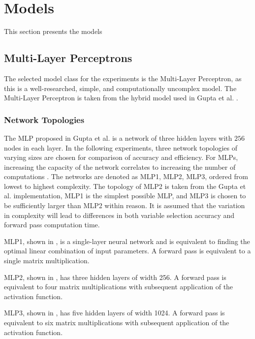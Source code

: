\section{Models}

This section presents the models 


\subsection{Multi-Layer Perceptrons}

The selected model class for the experiments is the Multi-Layer Perceptron, as this is a well-researched, simple, and computationally uncomplex model. The Multi-Layer Perceptron is taken from the hybrid model used in Gupta et al. \cite{gupta2020hybrid}.   


\subsubsection{Network Topologies}

The \gls{MLP} proposed in Gupta et al. \cite{gupta2020hybrid} is a network of three hidden layers with $ 256 $ nodes in each layer. In the following experiments, 
three network topologies of varying sizes are chosen for comparison of accuracy and efficiency. 
For MLPs, increasing the capacity of the network correlates to increasing the number of computations \cite{goodfellow2016deep}. The networks are denoted as MLP1, MLP2, MLP3, ordered from lowest to highest complexity. The topology of MLP2 is taken from the Gupta et al. \cite{gupta2020hybrid} implementation, MLP1 is the simplest possible MLP, and MLP3 is chosen to be sufficiently larger than MLP2 within reason. It is assumed that the variation in complexity will lead to differences in both variable selection accuracy and forward pass computation time. 

MLP1, shown in , is a single-layer neural network and is equivalent to finding the optimal linear combination of input parameters. A forward pass is equivalent to a single matrix multiplication. 

MLP2, shown in , has three hidden layers of width 256. A forward pass is equivalent to four matrix multiplications with subsequent application of the activation function.

MLP3, shown in , has five hidden layers of width 1024. A forward pass is equivalent to six matrix multiplications with subsequent application of the activation function.



